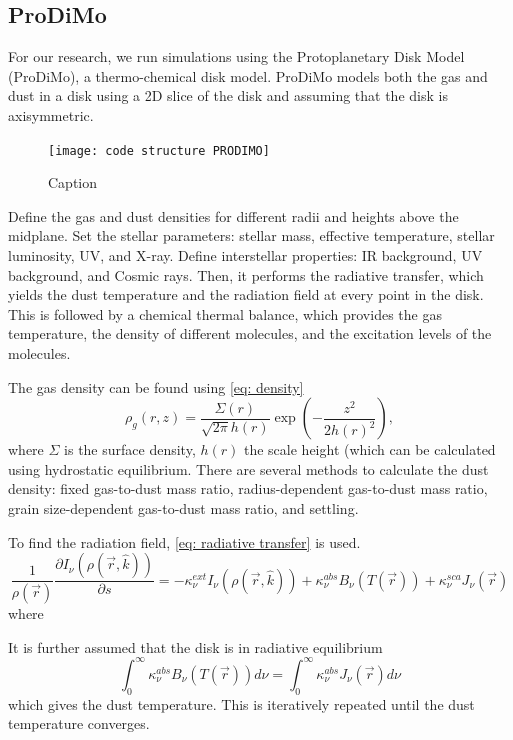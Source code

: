 \documentclass[twoside, single, authoryear, semicolon, 12pt]{lion-msc}
\renewcommand{\vec}[1] {\ensuremath{ \overrightarrow{ #1 } }}
\newcommand{\4}{$_4$}
\newcommand{\3}{$_3$}
\newcommand{\2}{$_2$}
\begin{document}
\subsection{ProDiMo}
For our research, we run simulations using the Protoplanetary Disk Model (ProDiMo), a thermo-chemical disk model. ProDiMo models both the gas and dust in a disk using a 2D slice of the disk and assuming that the disk is axisymmetric. 

\begin{figure}[H]
    \centering
    \texttt{[image: code structure PRODIMO]}
    \caption{Caption}
    \label{fig:enter-label}
\end{figure}

Define the gas and dust densities for different radii and heights above the midplane. Set the stellar parameters: stellar mass, effective temperature, stellar luminosity, UV, and X-ray. Define interstellar properties: IR background, UV background, and Cosmic rays.  Then, it performs the radiative transfer, which yields the dust temperature and the radiation field at every point in the disk. This is followed by a chemical thermal balance, which provides the gas temperature, the density of different molecules, and the excitation levels of the molecules. 

The gas density can be found using \autoref{eq: density}
\begin{equation}
    \rho_g(r,z)=\frac{\Sigma(r)}{\sqrt{2\pi}h(r)}\exp{\left(-\frac{z^2}{2h(r)^2}\right)},
    \label{eq: density}
\end{equation}
where $\Sigma$ is the surface density, $h(r)$ the scale height (which can be calculated using hydrostatic equilibrium. There are several methods to calculate the dust density: fixed gas-to-dust mass ratio, radius-dependent gas-to-dust mass ratio, grain size-dependent gas-to-dust mass ratio, and settling. 

To find the radiation field, \autoref{eq: radiative transfer} is used.
\begin{equation}
    \frac{1}{\rho(\vec{r})}\frac{\partial I_\nu(\rho(\vec{r}, \hat{k}))}{\partial s}=-\kappa^{ext}_\nu I_\nu(\rho(\vec{r}, \hat{k})) + \kappa^{abs}_\nu B_\nu(T(\vec{r})) + \kappa^{sca}_\nu J_\nu(\vec{r})
    \label{eq: radiative transfer}
\end{equation}
where 

It is further assumed that the disk is in radiative equilibrium 
\begin{equation}
    \int^\infty_0\kappa^{abs}_\nu B_\nu(T(\vec{r}))d\nu=\int^\infty_0\kappa^{abs}_\nu J_\nu(\vec{r})d\nu
\end{equation}
which gives the dust temperature. This is iteratively repeated until the dust temperature converges.
\end{document}
